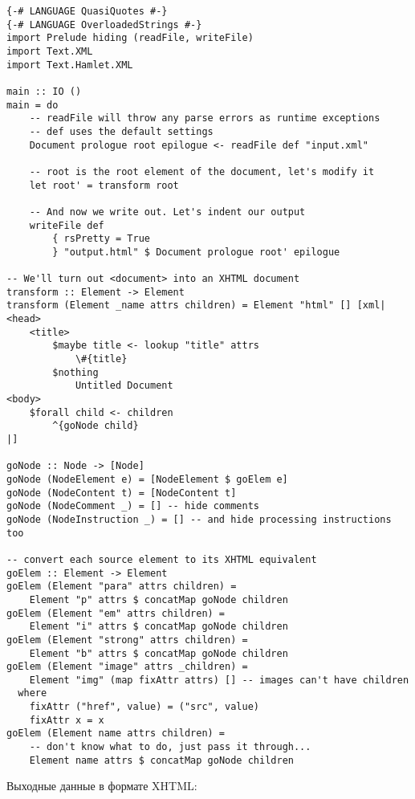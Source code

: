 \begin{lstlisting}
{-# LANGUAGE QuasiQuotes #-}
{-# LANGUAGE OverloadedStrings #-}
import Prelude hiding (readFile, writeFile)
import Text.XML
import Text.Hamlet.XML

main :: IO ()
main = do
    -- readFile will throw any parse errors as runtime exceptions
    -- def uses the default settings
    Document prologue root epilogue <- readFile def "input.xml"

    -- root is the root element of the document, let's modify it
    let root' = transform root

    -- And now we write out. Let's indent our output
    writeFile def
        { rsPretty = True
        } "output.html" $ Document prologue root' epilogue

-- We'll turn out <document> into an XHTML document
transform :: Element -> Element
transform (Element _name attrs children) = Element "html" [] [xml|
<head>
    <title>
        $maybe title <- lookup "title" attrs
            \#{title}
        $nothing
            Untitled Document
<body>
    $forall child <- children
        ^{goNode child}
|]

goNode :: Node -> [Node]
goNode (NodeElement e) = [NodeElement $ goElem e]
goNode (NodeContent t) = [NodeContent t]
goNode (NodeComment _) = [] -- hide comments
goNode (NodeInstruction _) = [] -- and hide processing instructions too

-- convert each source element to its XHTML equivalent
goElem :: Element -> Element
goElem (Element "para" attrs children) =
    Element "p" attrs $ concatMap goNode children
goElem (Element "em" attrs children) =
    Element "i" attrs $ concatMap goNode children
goElem (Element "strong" attrs children) =
    Element "b" attrs $ concatMap goNode children
goElem (Element "image" attrs _children) =
    Element "img" (map fixAttr attrs) [] -- images can't have children
  where
    fixAttr ("href", value) = ("src", value)
    fixAttr x = x
goElem (Element name attrs children) =
    -- don't know what to do, just pass it through...
    Element name attrs $ concatMap goNode children
\end{lstlisting}%

Выходные данные в формате XHTML:

